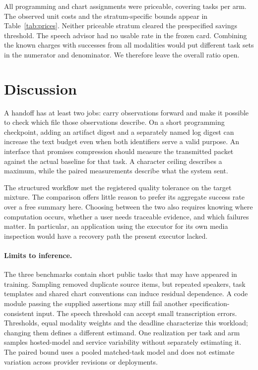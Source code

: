 \documentclass[10pt]{article}
\begin{document}
\begin{table}[ht]
\centering
\caption{API-equivalent US cents per verified file on completely priceable strata. Ratios compare Scoped with Full. Upper denotes the one-sided 95\% paired bootstrap upper bound.}
\label{tab:prices}
\end{table}

All programming and chart assignments were priceable, covering \PriceCoverage{} tasks per arm. The observed unit costs and the stratum-specific bounds appear in Table~\ref{tab:prices}. Neither priceable stratum cleared the prespecified savings threshold. The speech advisor had no usable rate in the frozen card. Combining the known charges with successes from all modalities would put different task sets in the numerator and denominator. We therefore leave the overall ratio open.

\section{Discussion}
A handoff has at least two jobs: carry observations forward and make it possible to check which file those observations describe. On a short programming checkpoint, adding an artifact digest and a separately named log digest can increase the text budget even when both identifiers serve a valid purpose. An interface that promises compression should measure the transmitted packet against the actual baseline for that task. A character ceiling describes a maximum, while the paired measurements describe what the system sent.

The structured workflow met the registered quality tolerance on the target mixture. The comparison offers little reason to prefer its aggregate success rate over a free summary here. Choosing between the two also requires knowing where computation occurs, whether a user needs traceable evidence, and which failures matter. In particular, an application using the executor for its own media inspection would have a recovery path the present executor lacked.

\paragraph{Limits to inference.}
The three benchmarks contain short public tasks that may have appeared in training. Sampling removed duplicate source items, but repeated speakers, task templates and shared chart conventions can induce residual dependence. A code module passing the supplied assertions may still fail another specification-consistent input. The speech threshold can accept small transcription errors. Thresholds, equal modality weights and the deadline characterize this workload; changing them defines a different estimand. One realization per task and arm samples hosted-model and service variability without separately estimating it. The paired bound uses a pooled matched-task model and does not estimate variation across provider revisions or deployments.
\end{document}

